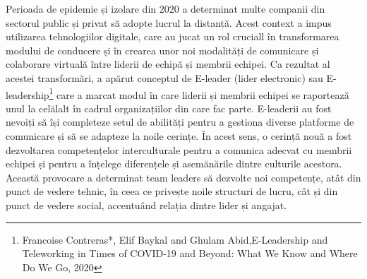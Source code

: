 \documentclass[a4paper, 12pt]{article}
\begin{document}

    \quad\quad Perioada de epidemie și izolare din 2020  a determinat multe companii din sectorul public și privat să adopte lucrul la distanță. Acest context a impus utilizarea tehnologiilor digitale, care au jucat un rol cruciall în transformarea modului de conducere și în crearea unor noi modalități de comunicare și colaborare virtuală între liderii de echipă și membrii echipei. Ca rezultat al acestei transformări, a apărut conceptul de E-leader (lider electronic) sau E-leadership\footnote{Francoise Contreras*, Elif Baykal and Ghulam Abid,E-Leadership and Teleworking in Times of COVID-19 and Beyond: What We Know and Where Do We Go, 2020}
 care a marcat modul în care liderii și membrii echipei se raportează unul la celălalt în cadrul organizațiilor din care fac parte. E-leaderii au fost nevoiți să își completeze setul de abilități pentru a gestiona diverse platforme de comunicare și să se adapteze la noile cerințe. În acest sens, o cerință nouă a fost dezvoltarea competențelor interculturale pentru a comunica adecvat cu membrii echipei și pentru a înțelege diferențele și asemănările dintre culturile acestora. Această provocare a determinat team leaders să dezvolte noi competențe, atât din punct de vedere tehnic, în ceea ce privește noile structuri de lucru, cât și din punct de vedere social, accentuând relația dintre lider și angajat.
\end{document}

